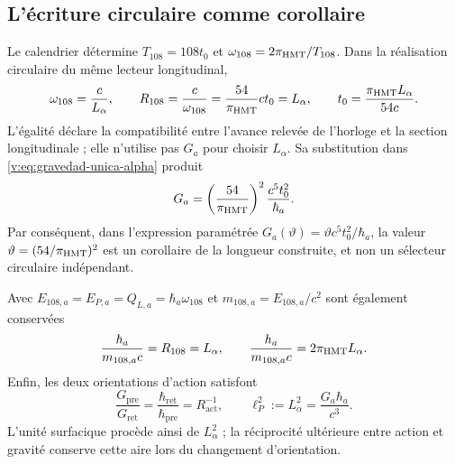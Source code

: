 \subsection{L’écriture circulaire comme corollaire}

Le calendrier détermine $T_{108}=108t_0$ et
$\omega_{108}=2\pi_{\mathrm{HMT}}/T_{108}$. Dans la réalisation circulaire du même
lecteur longitudinal,
\begin{equation}
 \omega_{108}=\frac{c}{L_\alpha},\qquad
 R_{108}=\frac{c}{\omega_{108}}
 =\frac{54}{\pi_{\mathrm{HMT}}}ct_0=L_\alpha,
 \qquad
 t_0=\frac{\pi_{\mathrm{HMT}}L_\alpha}{54c}.
 \label{v:eq:compatibilidad-reloj-longitud}
\end{equation}
L’égalité déclare la compatibilité entre l’avance relevée de l’horloge
et la section longitudinale ; elle n’utilise pas $G_a$ pour choisir $L_\alpha$.
Sa substitution dans \eqref{v:eq:gravedad-unica-alpha} produit
\begin{equation}
 G_a=\left(\frac{54}{\pi_{\mathrm{HMT}}}\right)^2
 \frac{c^5t_0^2}{\hbar_a}.
 \label{v:eq:gravedad-circular-corolario}
\end{equation}
Par conséquent, dans l’expression paramétrée
$G_a(\vartheta)=\vartheta c^5t_0^2/\hbar_a$, la valeur
$\vartheta=(54/\pi_{\mathrm{HMT}})^2$ est un corollaire de la longueur construite,
et non un sélecteur circulaire indépendant.

Avec
$E_{108,a}=E_{P,a}=Q_{L,a}=\hbar_a\omega_{108}$ et
$m_{108,a}=E_{108,a}/c^2$ sont également conservées
\[
 \frac{\hbar_a}{m_{108,a}c}=R_{108}=L_\alpha,
 \qquad
 \frac{h_a}{m_{108,a}c}=2\pi_{\mathrm{HMT}}L_\alpha.
\]
Enfin, les deux orientations d’action satisfont
\begin{equation}
 \frac{G_{\mathrm{pre}}}{G_{\mathrm{ret}}}
 =\frac{\hbar_{\mathrm{ret}}}{\hbar_{\mathrm{pre}}}
 =R_{\mathrm{act}}^{-1},
 \qquad
 \ell_P^2:=L_\alpha^2
 =\frac{G_a\hbar_a}{c^3}.
 \label{v:eq:reciprocidad-gravedad-accion}
\end{equation}
L’unité surfacique procède ainsi de $L_\alpha^2$ ; la réciprocité ultérieure
entre action et gravité conserve cette aire lors du changement d’orientation.
